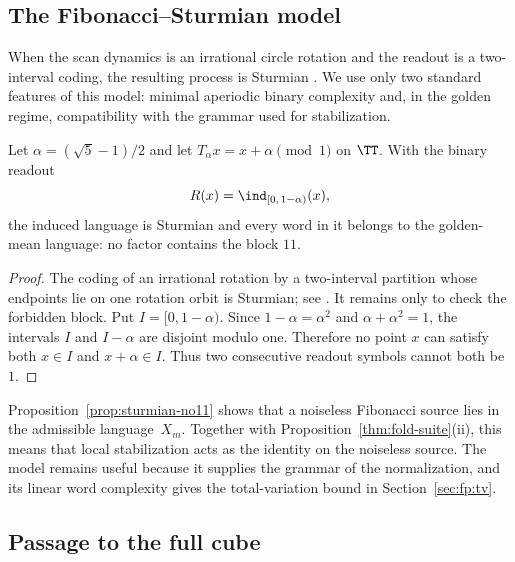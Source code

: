 \subsection{The Fibonacci--Sturmian model}\label{sec:readout:sturmian}

When the scan dynamics is an irrational circle rotation and the readout is a two-interval coding, the resulting process is Sturmian \cite{MorseHedlund1940,Lothaire2002,Queffelec2010}. We use only two standard features of this model: minimal aperiodic binary complexity and, in the golden regime, compatibility with the grammar used for stabilization.

\begin{proposition}\label{prop:sturmian-no11}
Let $\alpha=(\sqrt5-1)/2$ and let $T_\alpha x=x+\alpha\pmod 1$ on $\TT$.
With the binary readout
\[
R(x)=\ind_{[0,\,1-\alpha)}(x),
\]
the induced language is Sturmian and every word in it belongs to the
golden-mean language: no factor contains the block $11$.
\end{proposition}

\begin{proof}
The coding of an irrational rotation by a two-interval partition whose
endpoints lie on one rotation orbit is Sturmian; see
\cite{MorseHedlund1940,Lothaire2002,Queffelec2010}.  It remains only to check
the forbidden block.  Put $I=[0,1-\alpha)$.  Since $1-\alpha=\alpha^2$ and
$\alpha+\alpha^2=1$, the intervals $I$ and $I-\alpha$ are disjoint modulo
one.  Therefore no point $x$ can satisfy both $x\in I$ and
$x+\alpha\in I$.  Thus two consecutive readout symbols cannot both be $1$.
\end{proof}

\begin{remark}
Proposition~\ref{prop:sturmian-no11} shows that a noiseless Fibonacci source lies in the admissible language~$X_m$. Together with Proposition~\ref{thm:fold-suite}(ii), this means that local stabilization acts as the identity on the noiseless source. The model remains useful because it supplies the grammar of the normalization, and its linear word complexity gives the total-variation bound in Section~\ref{sec:fp:tv}.
\end{remark}

\subsection{Passage to the full cube}\label{sec:readout:noise}

